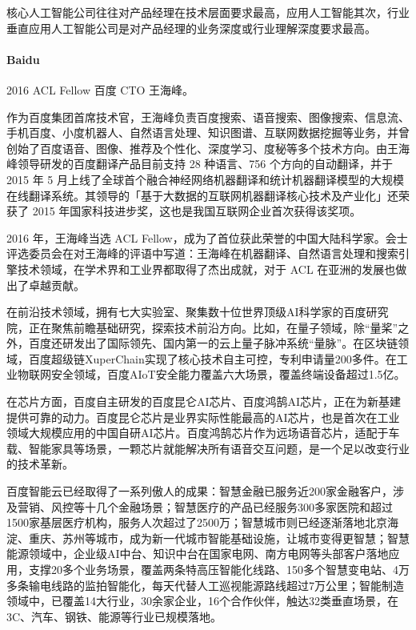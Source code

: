 \documentclass[letterpaper,11pt,english]{sphinxmanual}
\begin{document}
核心人工智能公司往往对产品经理在技术层面要求最高，应用人工智能其次，行业垂直应用人工智能公司是对产品经理的业务深度或行业理解深度要求最高。


\paragraph{Baidu}
\label{\detokenize{chapter_project/AI_company:baidu}}
2016 ACL Fellow 百度 CTO
王海峰。%
\begin{footnote}[231]\sphinxAtStartFootnote
{}
%
\end{footnote}

作为百度集团首席技术官，王海峰负责百度搜索、语音搜索、图像搜索、信息流、手机百度、小度机器人、自然语言处理、知识图谱、互联网数据挖掘等业务，并曾创始了百度语音、图像、推荐及个性化、深度学习、度秘等多个技术方向。由王海峰领导研发的百度翻译产品目前支持
28 种语言、756 个方向的自动翻译，并于 2015 年 5
月上线了全球首个融合神经网络机器翻译和统计机器翻译模型的大规模在线翻译系统。其领导的「基于大数据的互联网机器翻译核心技术及产业化」还荣获了
2015 年国家科技进步奖，这也是我国互联网企业首次获得该奖项。

2016 年，王海峰当选 ACL
Fellow，成为了首位获此荣誉的中国大陆科学家。会士评选委员会在对王海峰的评语中写道：王海峰在机器翻译、自然语言处理和搜索引擎技术领域，在学术界和工业界都取得了杰出成就，对于
ACL 在亚洲的发展也做出了卓越贡献。

在前沿技术领域，拥有七大实验室、聚集数十位世界顶级AI科学家的百度研究院，正在聚焦前瞻基础研究，探索技术前沿方向。比如，在量子领域，除“量桨”之外，百度还研发出了国际领先、国内第一的云上量子脉冲系统“量脉”。在区块链领域，百度超级链XuperChain实现了核心技术自主可控，专利申请量200多件。在工业物联网安全领域，百度AIoT安全能力覆盖六大场景，覆盖终端设备超过1.5亿。

在芯片方面，百度自主研发的百度昆仑AI芯片、百度鸿鹄AI芯片，正在为新基建提供可靠的动力。百度昆仑芯片是业界实际性能最高的AI芯片，也是首次在工业领域大规模应用的中国自研AI芯片。百度鸿鹄芯片作为远场语音芯片，适配于车载、智能家具等场景，一颗芯片就能解决所有语音交互问题，是一个足以改变行业的技术革新。

百度智能云已经取得了一系列傲人的成果：智慧金融已服务近200家金融客户，涉及营销、风控等十几个金融场景；智慧医疗的产品已经服务300多家医院和超过1500家基层医疗机构，服务人次超过了2500万；智慧城市则已经逐渐落地北京海淀、重庆、苏州等城市，成为新一代城市智能基础设施，让城市变得更智慧；智慧能源领域中，企业级AI中台、知识中台在国家电网、南方电网等头部客户落地应用，支撑20多个业务场景，覆盖两条特高压智能化线路、150多个智慧变电站、4万多条输电线路的监拍智能化，每天代替人工巡视能源路线超过7万公里；智能制造领域中，已覆盖14大行业，30余家企业，16个合作伙伴，触达32类垂直场景，在3C、汽车、钢铁、能源等行业已规模落地。
\end{document}
